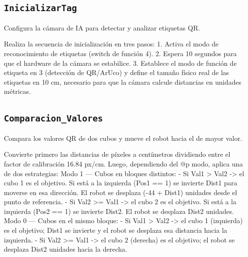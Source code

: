 \subsection{\texttt{InicializarTag}}
\label{fn:InicializarTag}
Configura la cámara de IA para detectar y analizar etiquetas QR.

Realiza la secuencia de inicialización en tres pasos: 1. Activa el modo de reconocimiento de etiquetas (switch de función 4). 2. Espera 10 segundos para que el hardware de la cámara se estabilice. 3. Establece el modo de función de etiqueta en 3 (detección de QR/ArUco) y define el tamaño físico real de las etiquetas en 10 cm, necesario para que la cámara calcule distancias en unidades métricas.


\subsection{\texttt{Comparacion\_Valores}}
\label{fn:ComparacionValores}
Compara los valores QR de dos cubos y mueve el robot hacia el de mayor valor.

Convierte primero las distancias de píxeles a centímetros dividiendo entre el factor de calibración 16.84 px/cm. Luego, dependiendo del @p modo, aplica una de dos estrategias: Modo 1 — Cubos en bloques distintos: - Si Val1 > Val2 -> el cubo 1 es el objetivo. Si está a la izquierda (Pos1 == 1) se invierte Dist1 para moverse en esa dirección. El robot se desplaza (-44 + Dist1) unidades desde el punto de referencia. - Si Val2 >= Val1 -> el cubo 2 es el objetivo. Si está a la izquierda (Pos2 == 1) se invierte Dist2. El robot se desplaza Dist2 unidades. Modo 0 — Cubos en el mismo bloque: - Si Val1 > Val2 -> el cubo 1 (izquierda) es el objetivo; Dist1 se invierte y el robot se desplaza esa distancia hacia la izquierda. - Si Val2 >= Val1 -> el cubo 2 (derecha) es el objetivo; el robot se desplaza Dist2 unidades hacia la derecha.

